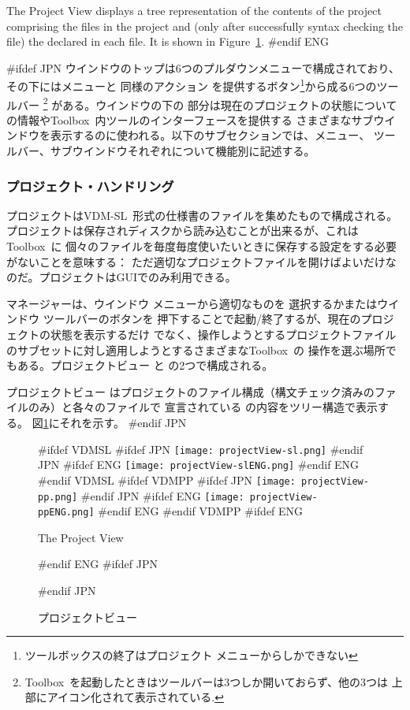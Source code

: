 \documentclass[\pformat,12pt]{article}
\newcommand{\vdmslpp}{VDM-SL}
\newcommand{\Toolbox}{Toolbox}
\newcommand{\vdmslpp}{VDM++}
\newcommand{\Toolbox}{Toolbox}
\newcommand{\guicmd}[1]{{\sf #1}}
\newcommand{\guicmd}[1]{{\gt #1}}
\begin{document}
The \guicmd{Project View} displays a tree representation of the contents
of the project comprising the files in the project and (only after
successfully syntax checking the file) the
 declared in each file. 
It is shown in Figure~\ref{fig:projectView}.
#endif ENG

#ifdef JPN
ウインドウのトップは6つのプルダウンメニューで構成されており、その下にはメニューと
同様のアクション を提供するボタン\footnote{ツールボックスの終了は\guicmd{プロジェクト} 
メニューからしかできない}から成る6つのツールバー
\footnote{\Toolbox\ を起動したときはツールバーは3つしか開いておらず、他の3つは
上部にアイコン化されて表示されている.} 
がある。ウインドウの下の
部分は現在のプロジェクトの状態についての情報や\Toolbox\ 内ツールのインターフェースを提供する
さまざまなサブウインドウを表示するのに使われる。以下のサブセクションでは、メニュー、
ツールバー、サブウインドウそれぞれについて機能別に記述する。

\subsubsection{プロジェクト・ハンドリング}
プロジェクトは\vdmslpp\ 形式の仕様書のファイルを集めたもので構成される。
プロジェクトは保存されディスクから読み込むことが出来るが、これは\Toolbox\ に
個々のファイルを毎度毎度使いたいときに保存する設定をする必要がないことを意味する：
ただ適切なプロジェクトファイルを開けばよいだけなのだ。プロジェクトはGUIでのみ利用できる。

\guicmd{マネージャー}は、\guicmd{ウインドウ} メニューから適切なものを
選択するかまたは\guicmd{ウインドウ} 
ツールバーのボタンを
押下することで起動/終了するが、現在のプロジェクトの状態を表示するだけ
でなく、操作しようとするプロジェクトファイルのサブセットに対し適用しようとするさまざまな\Toolbox\ の
操作を選ぶ場所でもある。\guicmd{プロジェクトビュー} と
\ifthenelse{\boolean{VDMsl}}{\guicmd{モジュールビュー}}{\guicmd{クラスビュー}}
の2つで構成される。

\guicmd{プロジェクトビュー} はプロジェクトのファイル構成（構文チェック済みのファイルのみ）と各々のファイルで
宣言されている
 の内容をツリー構造で表示する。
図\ref{fig:projectView}にそれを示す。
#endif JPN

\begin{figure}[tbh]
\begin{center}
\mbox{}
#ifdef VDMSL
#ifdef JPN
\texttt{[image: projectView-sl.png]}
#endif JPN
#ifdef ENG
\texttt{[image: projectView-slENG.png]}
#endif ENG
#endif VDMSL
#ifdef VDMPP
#ifdef JPN
\texttt{[image: projectView-pp.png]}
#endif JPN
#ifdef ENG
\texttt{[image: projectView-ppENG.png]}
#endif ENG
#endif VDMPP
#ifdef ENG
\caption{The Project View}
#endif ENG
#ifdef JPN
\caption{プロジェクトビュー}
#endif JPN
\label{fig:projectView}
\end{center}
\end{figure}
\end{document}
